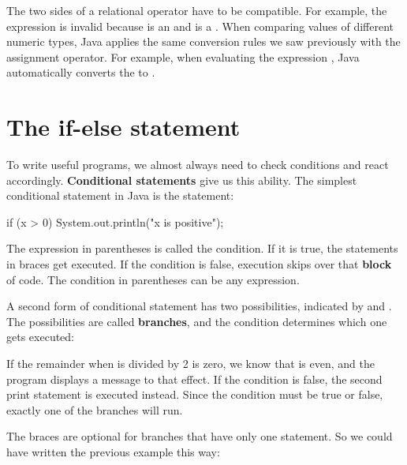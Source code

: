 The two sides of a relational operator have to be compatible.
For example, the expression  is invalid because  is an  and  is a .
When comparing values of different numeric types, Java applies the same conversion rules we saw previously with the assignment operator.
For example, when evaluating the expression , Java automatically converts the  to .


\section{The if-else statement}


To write useful programs, we almost always need to check conditions and react accordingly.
{\bf Conditional statements} give us this ability.
The simplest conditional statement in Java is the  statement:

\begin{code}
if (x > 0) {
    System.out.println("x is positive");
}
\end{code}


The expression in parentheses is called the condition.
If it is true, the statements in braces get executed.
If the condition is false, execution skips over that {\bf block} of code.
The condition in parentheses can be any  expression.


A second form of conditional statement has two possibilities, indicated by  and .
The possibilities are called {\bf branches}, and the condition determines which one gets executed:


If the remainder when  is divided by 2 is zero, we know that  is even, and the program displays a message to that effect.
If the condition is false, the second print statement is executed instead.
Since the condition must be true or false, exactly one of the branches will run.

The braces are optional for branches that have only one statement.
So we could have written the previous example this way:

